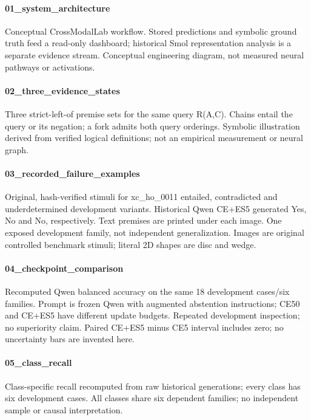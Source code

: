 \paragraph{01\_system\_architecture} Conceptual CrossModalLab workflow. Stored predictions and symbolic ground truth feed a read-only dashboard; historical Smol representation analysis is a separate evidence stream. Conceptual engineering diagram, not measured neural pathways or activations.

\paragraph{02\_three\_evidence\_states} Three strict-left-of premise sets for the same query R(A,C). Chains entail the query or its negation; a fork admits both query orderings. Symbolic illustration derived from verified logical definitions; not an empirical measurement or neural graph.

\paragraph{03\_recorded\_failure\_examples} Original, hash-verified stimuli for xc\_ho\_0011 entailed, contradicted and underdetermined development variants. Historical Qwen CE+ES5 generated Yes, No and No, respectively. Text premises are printed under each image. One exposed development family, not independent generalization. Images are original controlled benchmark stimuli; literal 2D shapes are disc and wedge.

\paragraph{04\_checkpoint\_comparison} Recomputed Qwen balanced accuracy on the same 18 development cases/six families. Prompt is frozen Qwen with augmented abstention instructions; CE50 and CE+ES5 have different update budgets. Repeated development inspection; no superiority claim. Paired CE+ES5 minus CE5 interval includes zero; no uncertainty bars are invented here.

\paragraph{05\_class\_recall} Class-specific recall recomputed from raw historical generations; every class has six development cases. All classes share six dependent families; no independent sample or causal interpretation.

